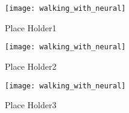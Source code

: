 \begin{figure}[!htbp]
  \begin{center}
      \texttt{[image: walking\_with\_neural]}
    \caption{Place Holder1}
    \label{fig:ssp1}
\end{center}
\end{figure}

\begin{figure}[!htbp]
  \begin{center}
      \texttt{[image: walking\_with\_neural]}
    \caption{Place Holder2}
    \label{fig:ssp2}
\end{center}
\end{figure}

\begin{figure}[!htbp]
  \begin{center}
      \texttt{[image: walking\_with\_neural]}
    \caption{Place Holder3}
    \label{fig:ssp3}
\end{center}
\end{figure}




